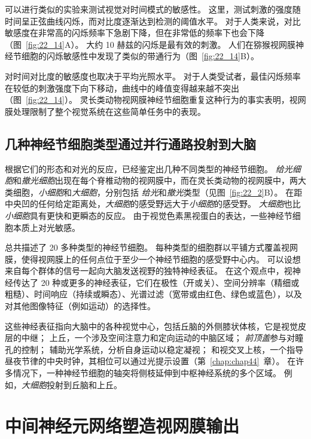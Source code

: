 \begin{proposition}[人类感知的时空敏感性]
	\quad \quad 可以进行类似的实验来测试视觉对时间模式的敏感性。
	这里，测试刺激的强度随时间呈正弦曲线闪烁，而对比度逐渐达到检测的阈值水平。
	对于人类来说，对比敏感度在非常高的闪烁频率下急剧下降，但在非常低的频率下也会下降（图~\ref{fig:22_14}A）。
	大约 10 赫兹的闪烁是最有效的刺激。
	人们在猕猴视网膜神经节细胞的闪烁敏感性中发现了类似的带通行为（图~\ref{fig:22_14}B）。
	
	\quad \quad 对时间对比度的敏感度也取决于平均光照水平。
	对于人类受试者，最佳闪烁频率在较低的刺激强度下向下移动，曲线中的峰值变得越来越不突出（图~\ref{fig:22_14}）。
	灵长类动物视网膜神经节细胞重复这种行为的事实表明，视网膜处理限制了整个视觉系统在这些简单任务中的表现。
	
\end{proposition}



\subsection{几种神经节细胞类型通过并行通路投射到大脑}

根据它们的形态和对光的反应，已经鉴定出几种不同类型的神经节细胞。
\textit{给光细胞}和\textit{撤光细胞}出现在每个脊椎动物的视网膜中，而在灵长类动物的视网膜中，两大类细胞，\textit{小细胞}和\textit{大细胞}，分别包括 \textit{给光}和\textit{撤光}类型（见图~\ref{fig:22_2}B）。
在距中央凹的任何给定距离处，\textit{大细胞}的感受野远大于\textit{小细胞}的感受野。
\textit{大细胞}也比\textit{小细胞}具有更快和更瞬态的反应。
由于视觉色素黑视蛋白的表达，一些神经节细胞本质上对光敏感。


总共描述了 20 多种类型的神经节细胞。
每种类型的细胞群以平铺方式覆盖视网膜，使得视网膜上的任何点位于至少一个神经节细胞的感受野中心内。
可以设想来自每个群体的信号一起向大脑发送视野的独特神经表征。
在这个观点中，视神经传达了 20 种或更多的神经表征，它们在极性（开或关）、空间分辨率（精细或粗糙）、时间响应（持续或瞬态）、光谱过滤（宽带或由红色、绿色或蓝色），以及对其他图像特征（例如运动）的选择性。


这些神经表征指向大脑中的各种视觉中心，包括丘脑的外侧膝状体核，它是视觉皮层的中继；
上丘，一个涉及空间注意力和定向运动的中脑区域；
\textit{前顶盖}参与对瞳孔的控制； 
辅助光学系统，分析自身运动以稳定凝视；
和视交叉上核，一个指导昼夜节律的中央时钟，其相位可以通过光提示设置（第~\ref{chap:chap44}~章）。 
在许多情况下，一种神经节细胞的轴突将侧枝延伸到中枢神经系统的多个区域。
例如，\textit{大细胞}投射到丘脑和上丘。



\section{中间神经元网络塑造视网膜输出}

